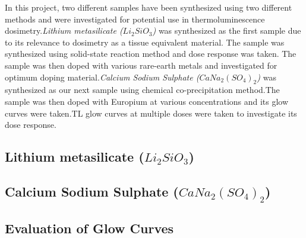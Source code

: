 \documentclass[../../Report.tex]{subfiles}
\begin{document}
    In this project, two different samples have been synthesized using two different methods and were investigated 
    for potential use in thermoluminescence dosimetry.\textit{Lithium metasilicate ($Li_2SiO_3$)} 
    was synthesized as the first sample due to its relevance to dosimetry as a tissue equivalent material. The sample 
    was synthesized using solid-state reaction method and dose response was taken. The sample was then doped with
    various rare-earth metals and investigated for optimum doping material.\textit{Calcium Sodium Sulphate ($CaNa_2{(SO_4)}_2$)} was 
    synthesized as our next sample using chemical co-precipitation method.The sample was then doped with Europium at various 
    concentrations and its glow curves were taken.TL glow curves at multiple doses were taken to investigate its dose response. 
    
    \subsection{\large Lithium metasilicate ($Li_2SiO_3$)}
        

    \subsection{\large Calcium Sodium Sulphate ($CaNa_2{(SO_4)}_2$)}
        

    
    \newpage
    \subsection{\large Evaluation of Glow Curves}
        
        
\end{document}
